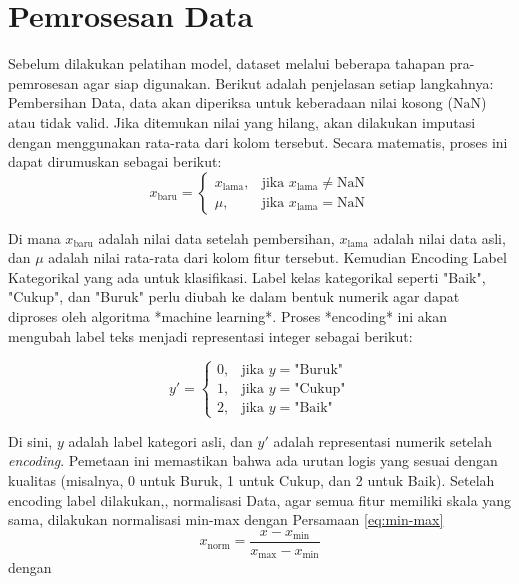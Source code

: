 \section{Pemrosesan Data}
\par Sebelum dilakukan pelatihan model, dataset melalui beberapa tahapan pra-pemrosesan agar siap digunakan. Berikut adalah penjelasan setiap langkahnya:
Pembersihan Data, data akan diperiksa untuk keberadaan nilai kosong ($\text{NaN}$) atau tidak valid. Jika ditemukan nilai yang hilang, akan dilakukan imputasi dengan menggunakan rata-rata dari kolom tersebut. Secara matematis, proses ini dapat dirumuskan sebagai berikut:
\begin{equation}
x_{\text{baru}} =
\begin{cases}
x_{\text{lama}}, & \text{jika } x_{\text{lama}} \neq \text{NaN} \\
\mu, & \text{jika } x_{\text{lama}} = \text{NaN}
\end{cases}
\end{equation}
\par Di mana $x_{\text{baru}}$ adalah nilai data setelah pembersihan, $x_{\text{lama}}$ adalah nilai data asli, dan $\mu$ adalah nilai rata-rata dari kolom fitur tersebut. Kemudian Encoding Label Kategorikal yang ada untuk klasifikasi. Label kelas kategorikal seperti "Baik", "Cukup", dan "Buruk" perlu diubah ke dalam bentuk numerik agar dapat diproses oleh algoritma *machine learning*. Proses *encoding* ini akan mengubah label teks menjadi representasi integer sebagai berikut:

\begin{equation}
    y' =
\begin{cases}
0, & \text{jika } y = \text{"Buruk"} \\
1, & \text{jika } y = \text{"Cukup"} \\
2, & \text{jika } y = \text{"Baik"}
\end{cases}
\end{equation}

\par Di sini, $y$ adalah label kategori asli, dan $y'$ adalah representasi numerik setelah \textit{encoding}. Pemetaan ini memastikan bahwa ada urutan logis yang sesuai dengan kualitas (misalnya, 0 untuk Buruk, 1 untuk Cukup, dan 2 untuk Baik). Setelah encoding label dilakukan,, normalisasi Data, agar semua fitur memiliki skala yang sama, dilakukan normalisasi min-max dengan Persamaan \ref{eq:min-max} 
\vspace{-1em}
\begin{equation}
x_{\text{norm}} = \frac{x - x_{\min}}{x_{\max} - x_{\min}}
\label{eq:min-max}
\end{equation}
\vspace{-1em}
\hspace{0.8cm}dengan
\vspace{-0.8em}

